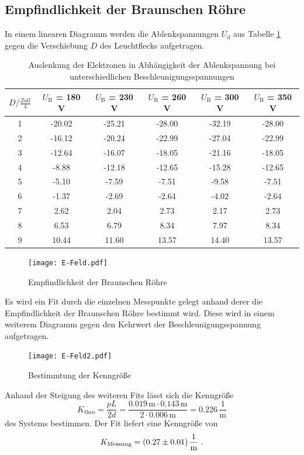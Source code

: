 \subsection{Empfindlichkeit der Braunschen Röhre}
In einem linearen Diagramm werden die Ablenkspannungen $U_\text{d}$ aus Tabelle \ref{tab:DIS} gegen die Verschiebung $D$ des Leuchtflecks aufgetragen.
\begin{table}
  \centering
  \begin{tabular}{c| c c c c c }
    \toprule
    $D / \frac{Zoll}{4}$ & $U_\text{B}$ = 180 V & $U_\text{B}$ = 230 V & $U_\text{B}$ = 260 V & $U_\text{B}$ = 300 V & $U_\text{B}$ = 350 V \\
    \midrule
    1 &	-20.02	&-25.21	&-28.00	&-32.19	&-28.00	\\
    2 &	-16.12	&-20.24	&-22.99	&-27.04	&-22.99	\\
    3 &	-12.64	&-16.07	&-18.05	&-21.16	&-18.05	\\
    4 &	-8.88	&-12.18	&-12.65	&-15.28	&-12.65	\\
    5 &	-5.10	&-7.59	&-7.51	&-9.58	&-7.51	\\
    6 &	-1.37	&-2.69	&-2.64	&-4.02	&-2.64	\\
    7 &	2.62	&2.04	&2.73	&2.17	&2.73	\\
    8 &	6.53	&6.79	&8.34	&7.97	&8.34	\\
    9 &	10.44	&11.60	&13.57	&14.40	&13.57	\\
    \bottomrule
  \end{tabular}
  \caption{Auslenkung der Elektronen in Abhängigkeit der Ablenkspannung bei unterschiedlichen Beschleunigungsspannungen}
  \label{tab:DIS}
\end{table}
\begin{figure}
  \centering
  \texttt{[image: E-Feld.pdf]}
  \caption{Empfindlichkeit der Braunschen Röhre}
  \label{fig:empf}
\end{figure}
Es wird ein Fit durch die einzelnen Messpunkte gelegt anhand derer die Empfindlichkeit der Braunschen Röhre bestimmt wird. Diese wird in einem weiterem Diagramm gegen den Kehrwert der Beschleunigungsspannung aufgetragen.
\begin{figure}
  \centering
  \texttt{[image: E-Feld2.pdf]}
  \caption{Bestimmtung der Kenngröße}
  \label{fig:K}
\end{figure}
Anhand der Steigung des weiteren Fits lässt sich die Kenngröße
\begin{equation}
  K_\text{theo} = \frac{p L}{2 d} = \frac{0.019 \, \text{m} \cdot 0.143 \, \text{m}}{2 \cdot 0.006 \, \text{m}} = 0.226 \, \frac{1}{\text{m}}
  \label{eqn:Ktheo}
\end{equation}
des Systems bestimmen. Der Fit liefert eine Kenngröße von
\begin{equation}
  K_\text{Messung} = (\num{0.27 +- 0.01}) \, \frac{1}{\text{m}} \ .
  \label{Kmess}
\end{equation}
